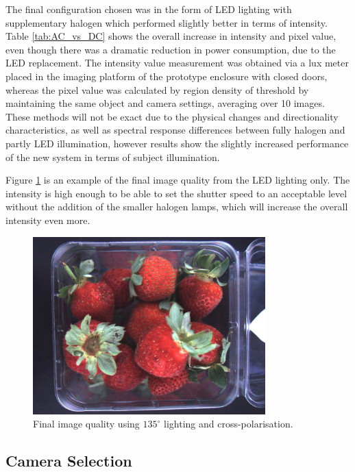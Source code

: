 \documentclass[fleqn,twoside,12pt]{report}
\begin{document}
The final configuration chosen was in the form of LED lighting with supplementary halogen which performed slightly better in terms of intensity. Table \ref{tab:AC_vs_DC} shows the overall increase in intensity and pixel value, even though there was a dramatic reduction in power consumption, due to the LED replacement. The intensity value measurement was obtained via a lux meter placed in the imaging platform of the prototype enclosure with closed doors, whereas the pixel value was calculated by region density of threshold by maintaining the same object and camera settings, averaging over 10 images. These methods will not be exact due to the physical changes and directionality characteristics, as well as spectral response differences between fully halogen and partly LED illumination, however results show the slightly increased performance of the new system in terms of subject illumination. 

Figure \ref{fig:final_image} is an example of the final image quality from the LED lighting only. The intensity is high enough to be able to set the shutter speed to an acceptable level without the addition of the smaller halogen lamps, which will increase the overall intensity even more.


\begin{figure}[h]
	\centering
	\includegraphics[width=0.8\textwidth]{final_image.jpg}
	\caption{Final image quality using $135^{\circ}$ lighting and cross-polarisation.}
	\label{fig:final_image}
\end{figure} 





\subsection{Camera Selection}
\end{document}
